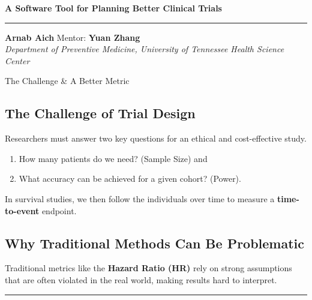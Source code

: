 \documentclass[a0,landscape]{a0poster}
\begin{document}
\pagestyle{empty}

\begin{center}
    \veryHuge \textbf{A Software Tool for Planning Better Clinical Trials} \\
    \vspace{0.25cm}
    \rule{\linewidth}{1.5pt}
    \vspace{0.25cm}
    \Huge \textbf{Arnab Aich} \hspace{1cm} Mentor: \textbf{Yuan Zhang}\\
    \huge \textit{Department of Preventive Medicine, University of Tennessee Health Science Center}
\end{center}
\vspace{0.5cm}

\begin{minipage}[t]{0.32\linewidth} %

\begin{posterbox}{The Challenge \& A Better Metric}
    \subsection*{\Large The Challenge of Trial Design}
    \large 
    Researchers must answer two key questions for an ethical and cost-effective study.
    \begin{enumerate}
        \item How many patients do we need? (Sample Size)  and 
        \item What accuracy can be achieved for a given cohort? (Power).
    \end{enumerate}

    \large
    In survival studies, we then follow the individuals over time to measure a \textbf{time-to-event} endpoint.
    

    \subsection*{\Large Why Traditional Methods Can Be Problematic}
    \large 
    Traditional metrics like the \textbf{Hazard Ratio (HR)} rely on strong assumptions that are often violated in the real world, making results hard to interpret.

    \vspace{0.25cm}\hrule\vspace{0.25cm}
    

\end{posterbox}
\end{minipage}
\end{document}
